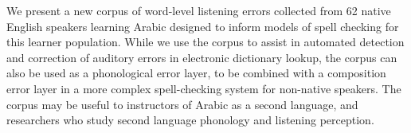 We present a new corpus of word-level listening errors collected from 62 native English speakers learning Arabic designed to inform models of spell checking for this learner population. While we use the corpus to assist in automated detection and correction of auditory errors in electronic dictionary lookup, the corpus can also be used as a phonological error layer, to be combined with a composition error layer in a more complex spell-checking system for non-native speakers. The corpus may be useful to instructors of Arabic as a second language, and researchers who study second language phonology and listening perception.
